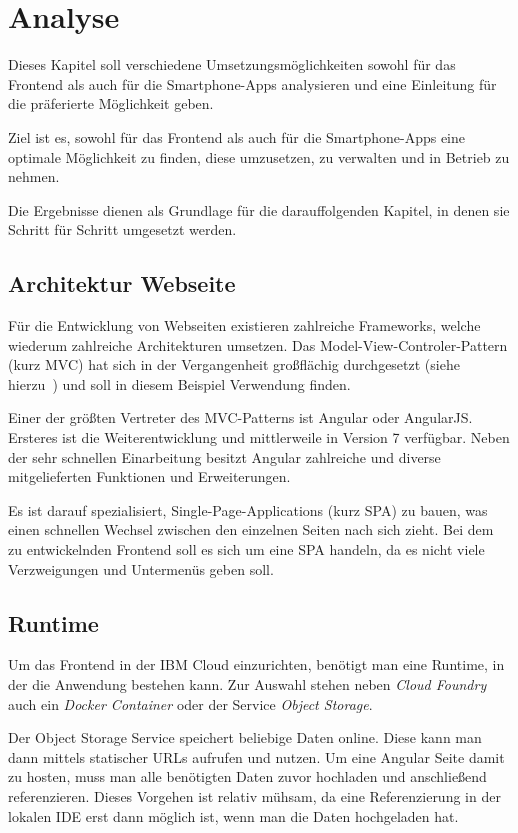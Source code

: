 \section{Analyse}
Dieses Kapitel soll verschiedene Umsetzungsmöglichkeiten sowohl für das Frontend als auch für die Smartphone-Apps
analysieren und eine Einleitung für die präferierte Möglichkeit geben.

Ziel ist es, sowohl für das Frontend als auch für die Smartphone-Apps eine optimale Möglichkeit zu finden, diese
umzusetzen, zu verwalten und in Betrieb zu nehmen.

Die Ergebnisse dienen als Grundlage für die darauffolgenden Kapitel, in denen sie Schritt für Schritt umgesetzt werden.

\subsection{Architektur Webseite}
Für die Entwicklung von Webseiten existieren zahlreiche Frameworks, welche wiederum zahlreiche Architekturen umsetzen.
Das Model-View-Controler-Pattern (kurz MVC) hat sich in der Vergangenheit großflächig durchgesetzt (siehe
hierzu~\cite{book_grundlagen_mvc}) und soll in diesem Beispiel Verwendung finden.

Einer der größten Vertreter des MVC-Patterns ist Angular oder AngularJS. Ersteres ist die Weiterentwicklung und
mittlerweile in Version 7 verfügbar. Neben der sehr schnellen Einarbeitung besitzt Angular zahlreiche und diverse
mitgelieferten Funktionen und Erweiterungen.

Es ist darauf spezialisiert, Single-Page-Applications (kurz SPA) zu bauen, was einen schnellen Wechsel zwischen den
einzelnen Seiten nach sich zieht. Bei dem zu entwickelnden Frontend soll es sich um eine SPA handeln, da es nicht viele
Verzweigungen und Untermenüs geben soll.

\subsection{Runtime}
Um das Frontend in der IBM Cloud einzurichten, benötigt man eine Runtime, in der die Anwendung bestehen kann. Zur
Auswahl stehen neben \textit{Cloud Foundry} auch ein \textit{Docker Container} oder der Service \textit{Object Storage}.

Der Object Storage Service speichert beliebige Daten online. Diese kann man dann mittels statischer URLs aufrufen und
nutzen. Um eine Angular Seite damit zu hosten, muss man alle benötigten Daten zuvor hochladen und anschließend
referenzieren. Dieses Vorgehen ist relativ mühsam, da eine Referenzierung in der lokalen IDE erst dann möglich ist, wenn
man die Daten hochgeladen hat.

